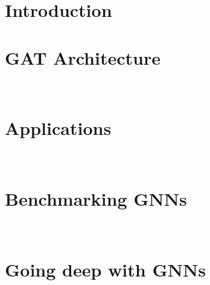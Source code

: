 \documentclass[11pt,oneside]{book}
\begin{document}


\clearpage
\newpage

\chapter*{Introduction}


\chapter*{GAT Architecture}
 \\

\chapter*{Applications}
 \\

\chapter*{Benchmarking GNNs}
 \\

\chapter*{Going deep with GNNs}
 \\ 

\newpage
{}

\renewcommand\bibname{References}

\end{document}
